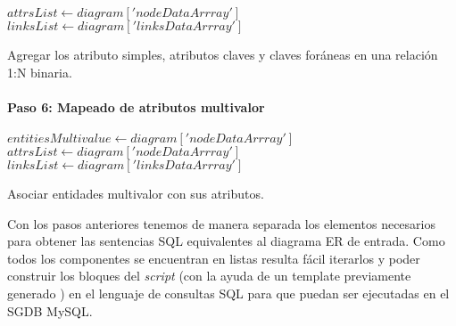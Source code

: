 \begin{algorithm}[H]

    $attrsList \gets diagram['nodeDataArrray']$
    $linksList \gets diagram['linksDataArrray']$
  \caption{Agregar los atributo simples, atributos claves y claves foráneas  en una relación 1:N binaria.}
\end{algorithm}

\paragraph*{Paso 6: Mapeado de atributos multivalor}

\begin{algorithm}[H]

  $entitiesMultivalue \gets diagram['nodeDataArrray']$\\
  $attrsList \gets diagram['nodeDataArrray']$\\
  $linksList \gets diagram['linksDataArrray']$\\
   {
  }
  \caption{Asociar entidades multivalor con sus atributos.}
\end{algorithm}

Con los pasos anteriores tenemos de manera separada los elementos necesarios para obtener las sentencias SQL equivalentes al diagrama ER de entrada. Como todos los componentes se encuentran en listas resulta fácil iterarlos y poder construir los bloques del \textit{script} (con la ayuda de un template previamente generado ) en el lenguaje de consultas SQL para que puedan ser ejecutadas en el SGDB MySQL.

